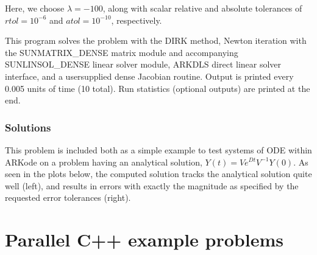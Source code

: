 \documentclass[letterpaper,10pt,english]{sphinxmanual}
\begin{document}
\sphinxAtStartPar
Here, we choose \(\lambda = -100\), along with scalar relative and
absolute tolerances of \(rtol=10^{-6}\) and \(atol=10^{-10}\),
respectively.

\sphinxAtStartPar
This program solves the problem with the DIRK method,
Newton iteration with the SUNMATRIX\_DENSE matrix module and
accompanying SUNLINSOL\_DENSE linear solver module, ARKDLS direct
linear solver interface, and a user\sphinxhyphen{}supplied dense Jacobian
routine.  Output is printed every 0.005 units of time (10 total).
Run statistics (optional outputs) are printed at the end.


\subsection{Solutions}
\label{\detokenize{cpp_serial:solutions}}
\sphinxAtStartPar
This problem is included both as a simple example to test systems of
ODE within ARKode on a problem having an analytical solution,
\(Y(t) = V e^{Dt} V^{-1} Y(0)\).  As seen in the plots below, the
computed solution tracks the analytical solution quite well (left),
and results in errors with exactly the magnitude as specified by the
requested error tolerances (right).

\noindent{}

\noindent{}

\sphinxstepscope


\chapter{Parallel C++ example problems}
\label{\detokenize{cpp_parallel:parallel-c-example-problems}}\label{\detokenize{cpp_parallel:parallel-cpp}}\label{\detokenize{cpp_parallel::doc}}
\end{document}
